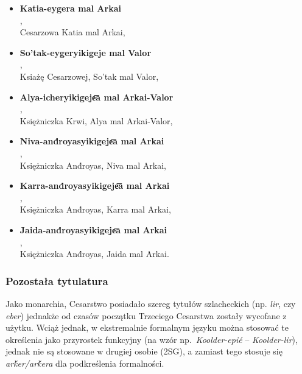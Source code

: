 \begin{spacing}{1.1}
\begin{itemize}
\item \textbf{Katia-eygera mal Arkai}\\ ,\\ 
Cesarzowa Katia mal Arkai,
\item \textbf{So'tak-eygeryikigeje mal Valor}\\ ,\\ Ksiażę Cesarzowej, So'tak mal Valor,
\item \textbf{Alya-icheryikigeje͞a mal Arkai-Valor}\\,\\ Księżniczka Krwi, Alya mal Arkai-Valor,
\item \textbf{Niva-and́royasyikigeje͞a mal Arkai}\\,\\ Księżniczka And́royas, Niva mal Arkai,
\item \textbf{Karra-and́royasyikigeje͞a mal Arkai}\\,\\ Księżniczka And́royas, Karra mal Arkai,
\item \textbf{Jaida-and́royasyikigeje͞a mal Arkai}\\,\\ Księżniczka And́royas, Jaida mal Arkai.
\end{itemize}


\subsubsection{Pozostała tytulatura}

Jako monarchia, Cesarstwo posiadało szereg tytułów szlacheckich (np. \emph{lir},
czy \emph{eber}) jednakże od czasów początku Trzeciego Cesarstwa zostały
wycofane z użytku. Wciąż jednak, w ekstremalnie formalnym języku można stosować
te określenia jako przyrostek funkcyjny (na wzór np.~\emph{Koolder-epié} --
\emph{Koolder-lir}), jednak nie są stosowane w drugiej osobie (\textsc{2SG}), a
zamiast tego stosuje się \emph{arḱer/arḱera} dla podkreślenia formalności.


\end{spacing}

